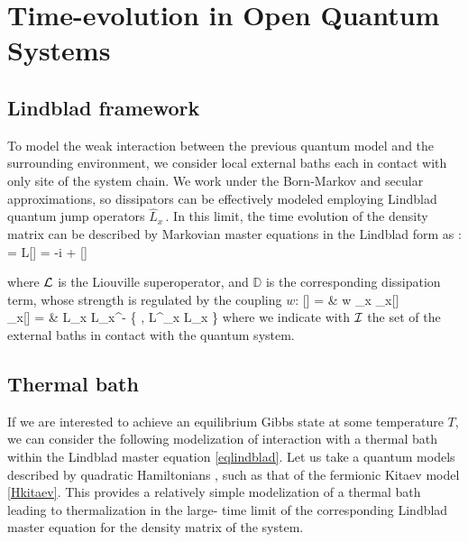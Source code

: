 \section{Time-evolution in Open Quantum Systems}


\subsection{Lindblad framework}

To model the weak interaction between the previous quantum model and the surrounding
environment, we consider local external baths each in contact with only site of the system
chain. We work under the Born-Markov and secular approximations, so dissipators 
can be effectively modeled employing Lindblad quantum jump operators $\hat L_x\,$. 
In this limit, the time evolution of the density matrix can be described by Markovian
master equations in the Lindblad form as \cite{BP-openquantumsystembook, TV-21}:
	 = {\cal L}[\rho] = 
		-i  +  \pc
\ea

where ${\cal L}$ is the Liouville superoperator, and $\mathbb{D}$ is the corresponding 
dissipation term, whose strength is regulated by the coupling $w$:
	[\rho] = & w \sum_{x } 
		_x[\rho] \cm \\
	_x[\rho] = &
		\hat L_x \rho \hat L_x^\dagger - 
		 \Bigl\{ \rho, \hat L^\dagger_x \hat L_x \Bigl\} \pc
\ea
where we indicate with ${\cal I}$ the set of the external baths in contact with the
quantum system.

\subsection{Thermal bath}

If we are interested to achieve an equilibrium Gibbs state at some temperature $T$, we
can consider the following modelization of interaction with a thermal bath within 
the Lindblad master equation \eqref{eqlindblad}.
Let us take a  quantum models described by quadratic Hamiltonians \cite{dr2021self}, 
such as that of the fermionic Kitaev model \eqref{Hkitaev}. This provides a relatively 
simple modelization of a thermal bath leading to thermalization in the large-
time limit of the corresponding Lindblad master equation
for the density matrix of the system.

